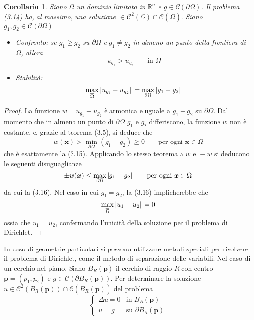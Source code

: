 \documentclass[a4paper,12pt, draft]{article}
\theoremstyle{break}
\newtheorem{corollary}{Corollario}[section]
\numberwithin{equation}{section}
\begin{document}
\begin{corollary}
  Siano \(\Omega\) un dominio limitato in \(\mathbb{R}^n\) e \(g \in \mathcal{C}(\partial\Omega)\). Il problema (3.14) ha, al massimo, una soluzione \(\in \mathcal{C}^2(\Omega) \cap \mathcal{C}(\overline{\Omega})\). Siano \(g_1, g_2 \in \mathcal{C}(\partial \Omega)\)
\begin{itemize}
  \item \emph{Confronto}: se \(g_1 \geq g_2\) su \(\partial \Omega\) e \(g_1 \not = g_2\) in almeno un punto della frontiera di \(\Omega\), allora 
  \begin{equation}
  u_{g_1} > u_{g_2} \qquad \mbox{in } \Omega  
  \end{equation}
  \item \emph{Stabilità}:
  \begin{equation}
    \max_{\overline{\Omega}}\abs*{u_{g_1} - u_{g_2}} = \max_{\partial \Omega}\abs*{g_1 - g_2}
  \end{equation} 
\end{itemize}
\end{corollary}
\begin{proof}
  La funzione \(w = u_{g_1} - u_{g_2}\) è armonica e uguale a \(g_1 - g_2\) su \(\partial \Omega\). Dal momento che in almeno un punto di \(\partial\Omega\) \(g_1\) e \(g_2\) differiscono, la funzione \(w\) non è costante, e, grazie al teorema (3.5), si deduce che 
  \[
    w(\bm{x}) > \min_{\partial \Omega}(g_1 - g_2) \geq 0 \qquad \mbox{per ogni } \bm{x} \in \Omega
  \]
  che è esattamente la (3.15). Applicando lo stesso teorema a \(w \mbox{ e } -w\) si deducono le seguenti disuguaglianze
  \[
    \pm w(\bm{x}) \leq \max_{\partial \Omega}\abs*{g_1 - g_2} \qquad \mbox{per ogni }\bm{x} \in \Omega
  \]
  da cui la (3.16). Nel caso in cui \(g_1 = g_2\), la (3.16) implicherebbe che 
  \[
    \max_{\overline{\Omega}}\abs*{u_1 - u_2} = 0
  \]
  ossia che \(u_1  = u_2\), confermando l'unicità della soluzione per il problema di Dirichlet.
\end{proof}
In caso di geometrie particolari si possono utilizzare metodi speciali per risolvere il problema di Dirichlet, come il metodo di separazione delle variabili. Nel caso di un cerchio nel piano. Siano \(B_R(\bm{p})\) il cerchio di raggio \(R\) con centro \(\bm{p} = (p_1, p_2)\) e \(g \in \mathcal{C}(\partial B_R(\bm{p}))\). Per determinare la soluzione \(u \in \mathcal{C}^2(B_R(\bm{p})) \cap \mathcal{C}(\overline{B}_R(\bm{p}))\) del problema
\begin{equation}
  \begin{cases}
    \Delta u = 0 & \mbox{in }B_R(\bm{p}) \\
    u = g  & \mbox{su } \partial B_R(\bm{p})
  \end{cases}
\end{equation}
\end{document}
